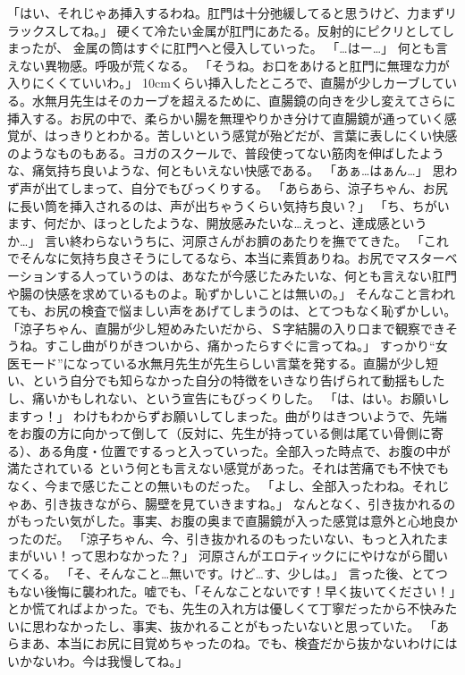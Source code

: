 「はい、それじゃあ挿入するわね。肛門は十分弛緩してると思うけど、力まずリラックスしてね。」
硬くて冷たい金属が肛門にあたる。反射的にピクリとしてしまったが、
金属の筒はすぐに肛門へと侵入していった。
「…はー…」
何とも言えない異物感。呼吸が荒くなる。
「そうね。お口をあけると肛門に無理な力が入りにくくていいわ。」
10cmくらい挿入したところで、直腸が少しカーブしている。水無月先生はそのカーブを超えるために、直腸鏡の向きを少し変えてさらに挿入する。お尻の中で、柔らかい腸を無理やりかき分けて直腸鏡が通っていく感覚が、はっきりとわかる。苦しいという感覚が殆どだが、言葉に表しにくい快感のようなものもある。ヨガのスクールで、普段使ってない筋肉を伸ばしたような、痛気持ち良いような、何ともいえない快感である。
「あぁ…はぁん…」
思わず声が出てしまって、自分でもびっくりする。
「あらあら、涼子ちゃん、お尻に長い筒を挿入されるのは、声が出ちゃうくらい気持ち良い？」
「ち、ちがいます、何だか、ほっとしたような、開放感みたいな…えっと、達成感というか…」
言い終わらないうちに、河原さんがお臍のあたりを撫でてきた。
「これでそんなに気持ち良さそうにしてるなら、本当に素質ありね。お尻でマスターベーションする人っていうのは、あなたが今感じたみたいな、何とも言えない肛門や腸の快感を求めているものよ。恥ずかしいことは無いの。」
そんなこと言われても、お尻の検査で悩ましい声をあげてしまうのは、とてつもなく恥ずかしい。
「涼子ちゃん、直腸が少し短めみたいだから、Ｓ字結腸の入り口まで観察できそうね。すこし曲がりがきついから、痛かったらすぐに言ってね。」
すっかり“女医モード”になっている水無月先生が先生らしい言葉を発する。直腸が少し短い、という自分でも知らなかった自分の特徴をいきなり告げられて動揺もしたし、痛いかもしれない、という宣告にもびっくりした。
「は、はい。お願いしますっ！」
わけもわからずお願いしてしまった。曲がりはきついようで、先端をお腹の方に向かって倒して（反対に、先生が持っている側は尾てい骨側に寄る）、ある角度・位置でするっと入っていった。全部入った時点で、お腹の中が満たされている という何とも言えない感覚があった。それは苦痛でも不快でもなく、今まで感じたことの無いものだった。
「よし、全部入ったわね。それじゃあ、引き抜きながら、腸壁を見ていきますね。」
なんとなく、引き抜かれるのがもったい気がした。事実、お腹の奥まで直腸鏡が入った感覚は意外と心地良かったのだ。
「涼子ちゃん、今、引き抜かれるのもったいない、もっと入れたままがいい！って思わなかった？」
河原さんがエロティックににやけながら聞いてくる。
「そ、そんなこと…無いです。けど…す、少しは。」
言った後、とてつもない後悔に襲われた。嘘でも、「そんなことないです！早く抜いてください！」とか慌てればよかった。でも、先生の入れ方は優しくて丁寧だったから不快みたいに思わなかったし、事実、抜かれることがもったいないと思っていた。
「あらまあ、本当にお尻に目覚めちゃったのね。でも、検査だから抜かないわけにはいかないわ。今は我慢してね。」
